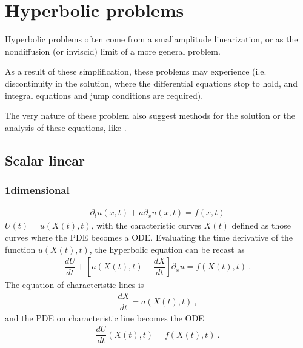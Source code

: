 \documentclass[letterpaper,10pt,english]{jupyterBook}
\begin{document}
\sphinxstepscope


\chapter{Hyperbolic problems}
\label{\detokenize{ch/pde/hyperbolic:hyperbolic-problems}}\label{\detokenize{ch/pde/hyperbolic:pde-hyperbolic}}\label{\detokenize{ch/pde/hyperbolic::doc}}
\sphinxAtStartPar
Hyperbolic problems often come from a small\sphinxhyphen{}amplitude linearization, or as the non\sphinxhyphen{}diffusion (or inviscid) limit of a more general problem.

\sphinxAtStartPar
As a result of these simplification, these problems may experience  (i.e. discontinuity in the solution, where the differential equations stop to hold, and integral equations and jump conditions are required).  

\sphinxAtStartPar
The very nature of these problem also suggest methods for the solution or the analysis of these equations, like .


\section{Scalar linear}
\label{\detokenize{ch/pde/hyperbolic:scalar-linear}}\label{\detokenize{ch/pde/hyperbolic:pde-hyperbolic-scalar-linear}}

\subsection{1\sphinxhyphen{}dimensional}
\label{\detokenize{ch/pde/hyperbolic:dimensional}}\begin{equation*}
\begin{split}\partial_t u(x,t) + a \partial_x u(x,t) = f(x,t)\end{split}
\end{equation*}
\sphinxAtStartPar
{} \(U(t) = u(X(t), t)\), with the caracteristic curves \(X(t)\) defined as those curves where the PDE becomes a ODE. Evaluating the time derivative of the function \(u(X(t),t)\), the hyperbolic equation can be recast as
\begin{equation*}
\begin{split}\dfrac{d U}{dt} + \left[ a(X(t),t) - \dfrac{d X}{d t} \right] \partial_x u = f(X(t),t) \ .\end{split}
\end{equation*}
\sphinxAtStartPar
The equation of characteristic lines is
\begin{equation*}
\begin{split}\dfrac{d X}{d t} = a(X(t), t) \ ,\end{split}
\end{equation*}
\sphinxAtStartPar
and the PDE on characteristic line becomes the ODE
\begin{equation*}
\begin{split}\dfrac{d U}{d t}(X(t), t) = f(X(t), t) \ .\end{split}
\end{equation*}
\end{document}
